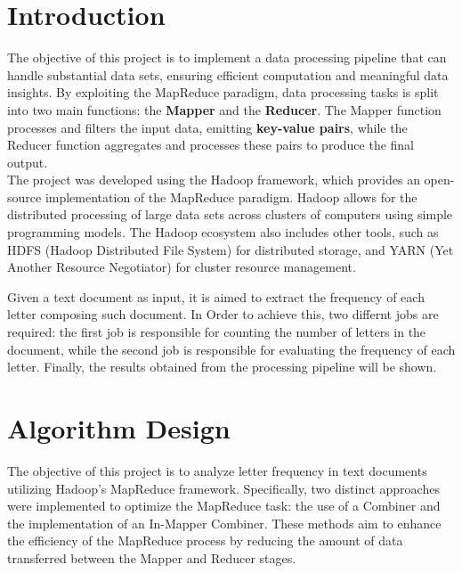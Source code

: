\documentclass[a4paper, 12pt]{article}
\begin{document}


\tableofcontents
\newpage
\section{Introduction}
The objective of this project is to implement a data processing pipeline that can handle substantial data sets, ensuring efficient computation and meaningful data insights. By exploiting the MapReduce paradigm, data processing tasks is split into two main functions: the \textbf{Mapper} and the \textbf{Reducer}.\newline
The Mapper function processes and filters the input data, emitting \textbf{key-value pairs}, while the Reducer function aggregates and processes these pairs to produce the final output.\\

\noindent The project was developed using the Hadoop framework, which provides an open-source implementation of the MapReduce paradigm. Hadoop allows for the distributed processing of large data sets across clusters of computers using simple programming models. The Hadoop ecosystem also includes other tools, such as HDFS (Hadoop Distributed File System) for distributed storage, and YARN (Yet Another Resource Negotiator) for cluster resource management.\newline

\noindent Given a text document as input, it is aimed to extract the frequency of each letter composing such document. In Order to achieve this, two differnt jobs are required: the first job is responsible for counting the number of letters in the document, while the second job is responsible for evaluating the frequency of each letter. Finally, the results obtained from the processing pipeline will be shown.



\section{Algorithm Design}
The objective of this project is to analyze letter frequency in text documents utilizing Hadoop's MapReduce framework. Specifically, two distinct approaches were implemented to optimize the MapReduce task: the use of a Combiner and the implementation of an In-Mapper Combiner. These methods aim to enhance the efficiency of the MapReduce process by reducing the amount of data transferred between the Mapper and Reducer stages.
\end{document}

